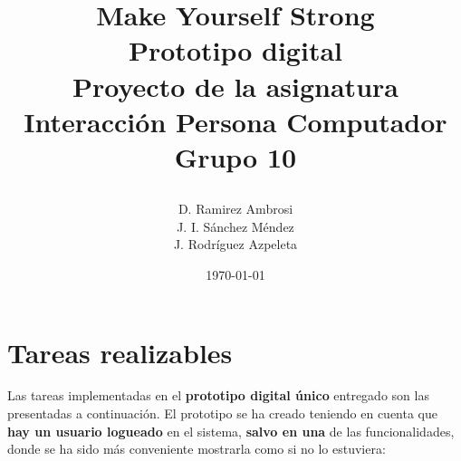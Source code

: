\documentclass[a4paper]{article}
\date{}
\author{D. Ramirez Ambrosi \\ J. I. Sánchez Méndez \\ J. Rodríguez Azpeleta}
\title{\begin{center}
\textbf{\Huge{Make Yourself Strong}} \\ Prototipo digital  \\Proyecto de la asignatura Interacción Persona Computador \\ \Huge{Grupo 10}
\end{center}}
\date{\today}
\renewcommand\listfigurename{\centering LISTA DE FIGURAS}
\begin{document}
\maketitle

\thispagestyle{empty}%
\newpage
\tableofcontents%
\thispagestyle{empty}
\newpage





\setcounter{page}{1}%


\section{Tareas realizables}

Las tareas implementadas en el \textbf{prototipo digital único} entregado son las presentadas a continuación. El prototipo se ha creado teniendo en cuenta que \textbf{hay un usuario logueado} en el sistema, \textbf{salvo en una} de las funcionalidades, donde se ha sido más conveniente mostrarla como si no lo estuviera:
\end{document}
